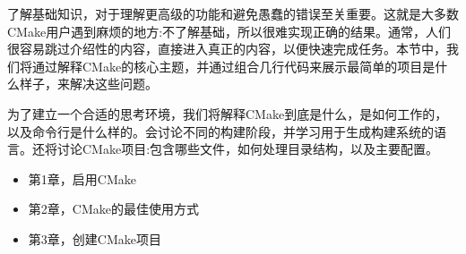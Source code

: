 了解基础知识，对于理解更高级的功能和避免愚蠢的错误至关重要。这就是大多数CMake用户遇到麻烦的地方:不了解基础，所以很难实现正确的结果。通常，人们很容易跳过介绍性的内容，直接进入真正的内容，以便快速完成任务。本节中，我们将通过解释CMake的核心主题，并通过组合几行代码来展示最简单的项目是什么样子，来解决这些问题。

为了建立一个合适的思考环境，我们将解释CMake到底是什么，是如何工作的，以及命令行是什么样的。会讨论不同的构建阶段，并学习用于生成构建系统的语言。还将讨论CMake项目:包含哪些文件，如何处理目录结构，以及主要配置。

\begin{itemize}
\item 第1章，启用CMake
\item 第2章，CMake的最佳使用方式
\item 第3章，创建CMake项目
\end{itemize}